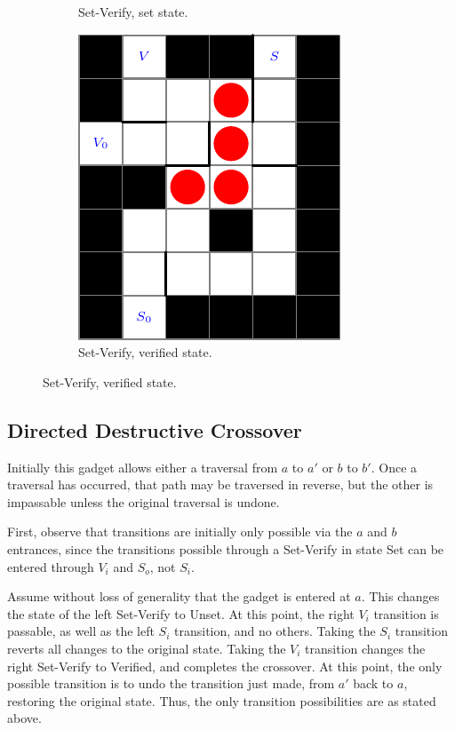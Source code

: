\documentclass[11pt]{article}
\begin{document}
\begin{figure}[!ht]
\begin{subfigure}[b]{0.3\textwidth}
    \caption{Set-Verify, set state.}
    \label{ldeDiagrams}
  \end{subfigure}
  \begin{subfigure}[b]{0.3\textwidth}
    \includegraphics[width=\textwidth]{SetVerifyVerified}
    \caption{Set-Verify, verified state.}
    \label{ldeDiagrams}
  \end{subfigure}
\end{figure}

\subsection{Directed Destructive Crossover}
Initially this gadget allows either a traversal from $a$ to $a'$ or $b$ to $b'$. Once a traversal has occurred, that path may be traversed in reverse, but the other is impassable unless the original traversal is undone.

First, observe that transitions are initially only possible via the $a$ and $b$ entrances, since the transitions
possible through a Set-Verify in state Set can be entered through $V_i$ and $S_o$, not $S_i$.

Assume without loss of generality that the gadget is entered at $a$. This changes the state of the left Set-Verify
to Unset. At this point, the right $V_i$ transition is passable, as well as the left $S_i$ transition, 
and no others. Taking the $S_i$ transition reverts all changes to the original state. Taking the $V_i$ transition
changes the right Set-Verify to Verified, and completes the crossover. At this point, the only possible transition
is to undo the transition just made, from $a'$ back to $a$, restoring the original state. Thus, the only transition possibilities are as stated above.
\end{document}
